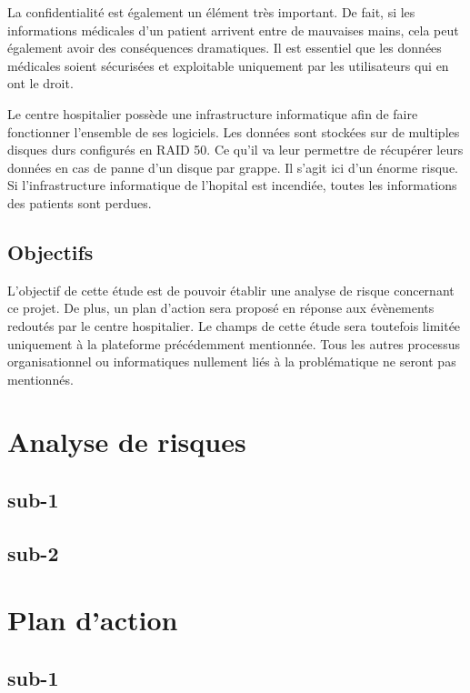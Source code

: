 \documentclass[12pt]{article}
\begin{document}
\justify
La confidentialité est également un élément très important. De fait, si les informations médicales d'un patient arrivent entre de mauvaises mains, cela peut également avoir des conséquences dramatiques. Il est essentiel que les données médicales soient sécurisées et exploitable uniquement par les utilisateurs qui en ont le droit.

\justify
Le centre hospitalier possède une infrastructure informatique afin de faire fonctionner l'ensemble de ses logiciels. Les données sont stockées sur de multiples disques durs configurés en RAID 50. Ce qu'il va leur permettre de récupérer leurs données en cas de panne d'un disque par grappe. Il s'agit ici d'un énorme risque. Si l'infrastructure informatique de l'hopital est incendiée, toutes les informations des patients sont perdues.

\subsection{Objectifs}

\justify
L'objectif de cette étude est de pouvoir établir une analyse de risque concernant ce projet. De plus, un plan d'action sera proposé en réponse aux évènements redoutés par le centre hospitalier. Le champs de cette étude sera toutefois limitée uniquement à la plateforme précédemment mentionnée. Tous les autres processus organisationnel ou informatiques nullement liés à la problématique ne seront pas mentionnés.

\newpage

\section{Analyse de risques}

\subsection{sub-1}

\subsection{sub-2}

\section{Plan d'action}

\subsection{sub-1}
\end{document}
